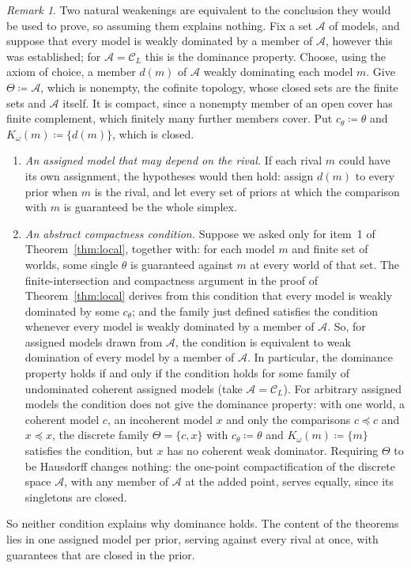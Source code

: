 \documentclass[11pt]{article}
\theoremstyle{definition}
\theoremstyle{remark}
\newtheorem{remark}[theorem]{Remark}
\newcommand{\C}{\mathcal C}
\begin{document}
\begin{remark}\label{rem:collapse}
Two natural weakenings are equivalent to the conclusion they would be used to prove, so assuming them explains nothing. Fix a set $\mathcal A$ of models, and suppose that every model is weakly dominated by a member of $\mathcal A$, however this was established; for $\mathcal A=\C_L$ this is the dominance property. Choose, using the axiom of choice, a member $d(m)$ of $\mathcal A$ weakly dominating each model $m$. Give $\Theta\coloneqq\mathcal A$, which is nonempty, the cofinite topology, whose closed sets are the finite sets and $\mathcal A$ itself. It is compact, since a nonempty member of an open cover has finite complement, which finitely many further members cover. Put $c_\theta\coloneqq\theta$ and $K_\omega(m)\coloneqq\{d(m)\}$, which is closed.
\begin{enumerate}[label=(\roman*)]
\item \emph{An assigned model that may depend on the rival.} If each rival $m$ could have its own assignment, the hypotheses would then hold: assign $d(m)$ to every prior when $m$ is the rival, and let every set of priors at which the comparison with $m$ is guaranteed be the whole simplex.
\item \emph{An abstract compactness condition.} Suppose we asked only for item~1 of Theorem~\ref{thm:local}, together with: for each model $m$ and finite set of worlds, some single $\theta$ is guaranteed against $m$ at every world of that set. The finite-intersection and compactness argument in the proof of Theorem~\ref{thm:local} derives from this condition that every model is weakly dominated by some $c_\theta$; and the family just defined satisfies the condition whenever every model is weakly dominated by a member of $\mathcal A$. So, for assigned models drawn from $\mathcal A$, the condition is equivalent to weak domination of every model by a member of $\mathcal A$. In particular, the dominance property holds if and only if the condition holds for some family of undominated coherent assigned models (take $\mathcal A=\C_L$). For arbitrary assigned models the condition does not give the dominance property: with one world, a coherent model $c$, an incoherent model $x$ and only the comparisons $c\preceq c$ and $x\preceq x$, the discrete family $\Theta=\{c,x\}$ with $c_\theta\coloneqq\theta$ and $K_\omega(m)\coloneqq\{m\}$ satisfies the condition, but $x$ has no coherent weak dominator. Requiring $\Theta$ to be Hausdorff changes nothing: the one-point compactification of the discrete space $\mathcal A$, with any member of $\mathcal A$ at the added point, serves equally, since its singletons are closed.
\end{enumerate}
So neither condition explains why dominance holds. The content of the theorems lies in one assigned model per prior, serving against every rival at once, with guarantees that are closed in the prior.
\end{remark}
\end{document}
